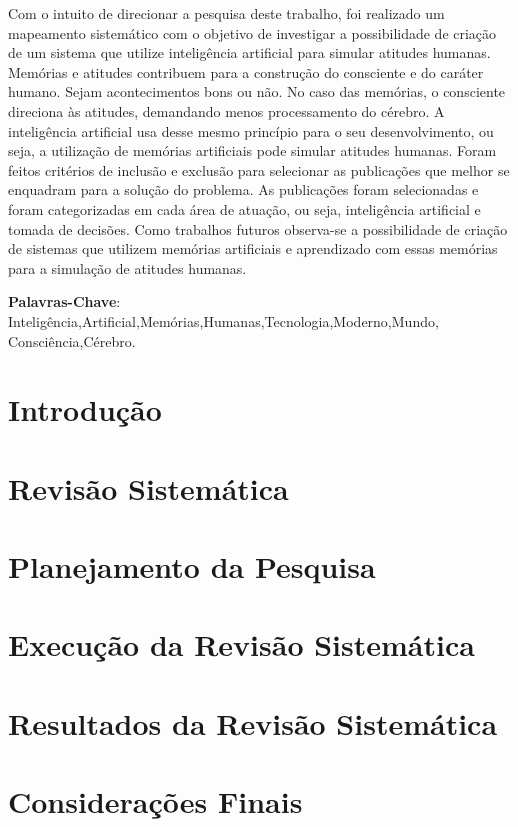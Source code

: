 Com o intuito de direcionar a pesquisa deste trabalho, foi realizado um mapeamento sistemático com o objetivo de investigar a possibilidade de criação de um sistema que utilize inteligência artificial para simular atitudes humanas. Memórias e atitudes contribuem para a construção do consciente e do caráter humano. Sejam acontecimentos bons ou não. No caso das memórias, o consciente direciona às atitudes, demandando menos processamento do cérebro. A inteligência artificial usa desse mesmo princípio para o seu desenvolvimento, ou seja, a utilização de memórias artificiais pode simular atitudes humanas. Foram feitos critérios de inclusão e exclusão para selecionar as publicações que melhor se enquadram para a solução do problema. As publicações foram selecionadas e foram categorizadas em cada área de atuação, ou seja, inteligência artificial e tomada de decisões. Como trabalhos futuros observa-se a possibilidade de criação de sistemas que utilizem memórias artificiais e aprendizado com essas memórias para a simulação de atitudes humanas.

\noindent
 
\textbf{Palavras-Chave}: Inteligência,Artificial,Memórias,Humanas,Tecnologia,Moderno,Mundo,
\\Consciência,Cérebro.

\vspace{2cm}

\section{Introdução}
\label{introducao}


\section{Revisão Sistemática}
\label{sec:revisaosistematica}


\vspace{1cm}
\section{Planejamento da Pesquisa}
\label{sec:planejamento}


\vspace{1cm}
\section{Execução da Revisão Sistemática}
\label{sec:execucao}


\vspace{1cm}
\section{Resultados da Revisão Sistemática}
\label{sec:resultados}


\vspace{1cm}
\section{Considerações Finais}
\label{sec:consideracoes}
